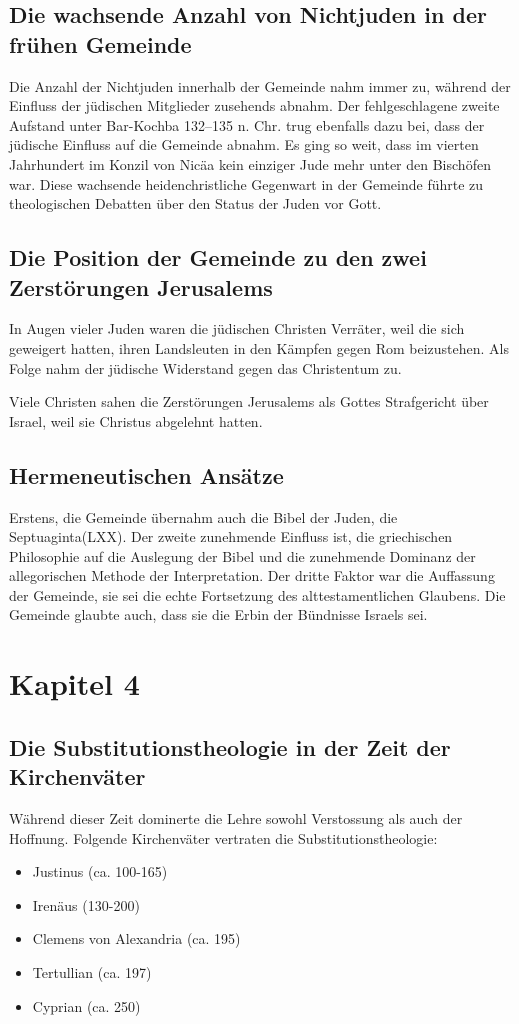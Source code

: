 \documentclass{../../inc/mybib}
\newcommand{\st}{Substitutionstheolog}
\begin{document}
    \subsection{Die wachsende Anzahl von Nichtjuden in der frühen Gemeinde}
    Die Anzahl der Nichtjuden innerhalb der Gemeinde nahm immer zu, während der Einfluss der jüdischen Mitglieder zusehends abnahm. Der fehlgeschlagene zweite Aufstand unter Bar-Kochba 132--135 n. Chr. trug ebenfalls dazu bei, dass der jüdische Einfluss auf die Gemeinde abnahm. Es ging so weit, dass im vierten Jahrhundert im Konzil von Nicäa kein einziger Jude mehr unter den Bischöfen war. Diese wachsende heidenchristliche Gegenwart in der Gemeinde führte zu theologischen Debatten über den Status der Juden vor Gott.
    \subsection{Die Position der Gemeinde zu den zwei Zerstörungen Jerusalems}
    In Augen vieler Juden waren die jüdischen Christen Verräter, weil die sich geweigert hatten, ihren Landsleuten in den Kämpfen gegen Rom beizustehen. Als Folge nahm der jüdische Widerstand gegen das Christentum zu.

    Viele Christen sahen die Zerstörungen Jerusalems als Gottes Strafgericht über Israel, weil sie Christus abgelehnt hatten.
    \subsection{Hermeneutischen Ansätze}
    Erstens, die Gemeinde übernahm auch die Bibel der Juden, die Septuaginta(LXX). Der zweite zunehmende Einfluss
    ist, die griechischen Philosophie auf die Auslegung der Bibel und die zunehmende Dominanz der allegorischen Methode der Interpretation. Der dritte Faktor war die Auffassung der Gemeinde, sie sei die echte Fortsetzung des alttestamentlichen Glaubens. Die Gemeinde glaubte auch, dass sie die Erbin der Bündnisse Israels sei.
    \section{Kapitel 4}
    \subsection{Die \st ie in der Zeit der Kirchenväter}
    Während dieser Zeit dominerte die Lehre sowohl Verstossung als auch der Hoffnung.
    Folgende Kirchenväter vertraten die \st ie:
    \begin{itemize}
        \item Justinus (ca. 100-165)
        \item Irenäus (130-200)
        \item Clemens von Alexandria (ca. 195)
        \item Tertullian (ca. 197)
        \item Cyprian (ca. 250)
    \end{itemize}
    
\end{document}
